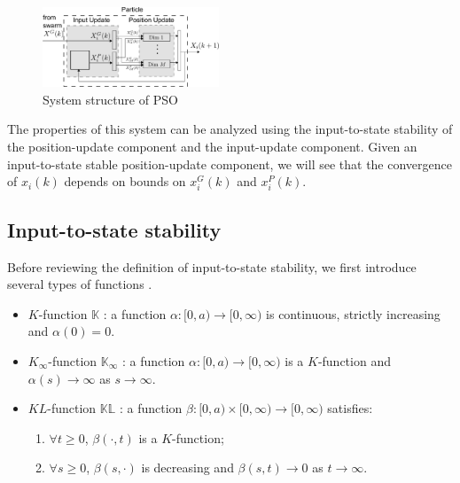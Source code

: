 \documentclass{sig-alternate}
\begin{document}
\begin{figure}
	\centering
	\includegraphics[width=0.47\textwidth]{particle_sys_flow.pdf}
	\caption{System structure of PSO}
	\label{fig:sys_flow}
\end{figure}

The properties of this system can be analyzed using the input-to-state stability of the position-update component and the input-update component. 
Given an input-to-state stable position-update component, we will see that the convergence of $ x_{i}(k) $ depends on bounds on $ x^{G}_{i}(k) $ and $ x^{P}_{i}(k) $.

\subsection{Input-to-state stability}
\label{sec:def_iss}

Before reviewing the definition of input-to-state stability, we first introduce several types of functions \cite{Jiang2001857}.
\begin{itemize}
	\item $ K $-function $ \mathbb{K} $ : a function $ \alpha  : [ 0, a ) \rightarrow [ 0, \infty ) $ is continuous, strictly increasing and $ \alpha (0) = 0 $.
	\item $ K_{\infty} $-function $ \mathbb{K}_{\infty} $ :  a function $ \alpha  : [ 0, a ) \rightarrow [ 0, \infty ) $ is a $ K $-function and $ \alpha (s) \rightarrow \infty $ as $ s \rightarrow \infty $.
	\item $ KL $-function $ \mathbb{KL} $ : a function $ \beta : [ 0, a ) \times [ 0 , \infty ) \rightarrow [ 0, \infty ) $ satisfies:
	\begin{enumerate}
		\item $ \forall t \geq 0 $, $ \beta (\cdot , t ) $ is a $ K $-function;
		\item $ \forall s \geq 0 $, $ \beta (s, \cdot) $ is decreasing and $ \beta(s,t) \rightarrow 0 $ as $ t \rightarrow \infty $.
	\end{enumerate}
\end{itemize}
\end{document}
